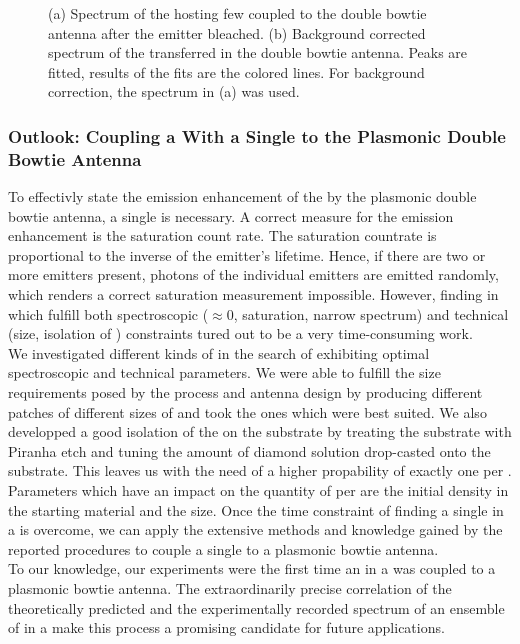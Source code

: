 \begin{figure}[tp]
\begin{subfigure}[t]{ 0.49\linewidth}
							\caption{}
							\label{subfig::single_siv_spec_after_transfer_antenna_bkg_corrected}
						\end{subfigure}
						\caption{(a) Spectrum of the \nd hosting few \sivs coupled to the double bowtie antenna after the emitter bleached. (b) Background corrected spectrum of the transferred \nd in the double bowtie antenna. Peaks are fitted, results of the fits are the colored lines. For background correction, the spectrum in (a) was used.}
					\end{figure}

				\subsubsection{Outlook: Coupling a \Nd With a Single \Siv to the Plasmonic Double Bowtie Antenna}
					To effectivly state the emission enhancement of the \siv by the plasmonic double bowtie antenna, a single \siv is necessary.
					A correct measure for the emission enhancement is the saturation count rate.
					The saturation countrate is proportional to the inverse of the emitter's lifetime.
					Hence, if there are two or more emitters present, photons of the individual emitters are emitted randomly, which renders a correct saturation measurement impossible.
					However, finding \sivs in \nds which fulfill both spectroscopic (\gtz $\approx$0, saturation, narrow \ZPL spectrum) and technical (size, isolation of \nds) constraints tured out to be a very time-consuming work.
					\\
					We investigated different kinds of \nds in the search of \nds exhibiting optimal spectroscopic and technical parameters.
					We were able to fulfill the size requirements posed by the \pp process and antenna design by producing different patches of different sizes of \nds and took the ones which were best suited.
					We also developped a good isolation of the \nds on the substrate by treating the \ir substrate with Piranha etch and tuning the amount of diamond solution drop-casted onto the substrate.
					This leaves us with the need of a higher propability of exactly one \siv per \nd.
					Parameters which have an impact on the quantity of \sivs per \nd are the initial \siv density in the starting material and the \nd size.
					Once the time constraint of finding a single \siv in a \nd is overcome, we can apply the extensive methods and knowledge gained by the reported procedures to couple a single \siv to a plasmonic bowtie antenna.
					\\
					To our knowledge, our experiments were the first time an \siv in a \nd was coupled to a plasmonic bowtie antenna.
					The extraordinarily precise correlation of the theoretically predicted and the experimentally recorded spectrum of an ensemble of \sivs in a \nd make this process a promising candidate for future applications.
